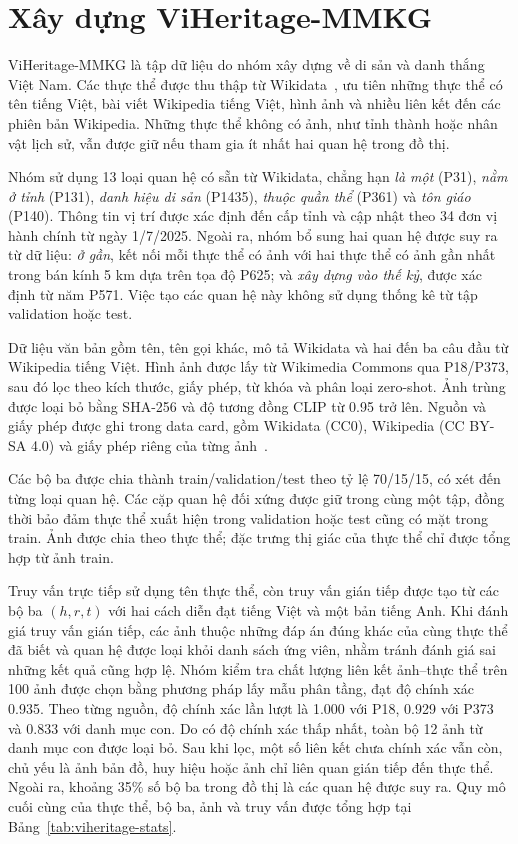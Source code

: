 \section{Xây dựng ViHeritage-MMKG}
\label{sec:viheritage-construction}

ViHeritage-MMKG là tập dữ liệu do nhóm xây dựng về di sản và danh thắng Việt Nam. Các thực thể được thu thập từ Wikidata~\cite{vrandecic2014wikidata}, ưu tiên những thực thể có tên tiếng Việt, bài viết Wikipedia tiếng Việt, hình ảnh và nhiều liên kết đến các phiên bản Wikipedia. Những thực thể không có ảnh, như tỉnh thành hoặc nhân vật lịch sử, vẫn được giữ nếu tham gia ít nhất hai quan hệ trong đồ thị.

Nhóm sử dụng 13 loại quan hệ có sẵn từ Wikidata, chẳng hạn \textit{là một} (P31), \textit{nằm ở tỉnh} (P131), \textit{danh hiệu di sản} (P1435), \textit{thuộc quần thể} (P361) và \textit{tôn giáo} (P140). Thông tin vị trí được xác định đến cấp tỉnh và cập nhật theo 34 đơn vị hành chính từ ngày 1/7/2025. Ngoài ra, nhóm bổ sung hai quan hệ được suy ra từ dữ liệu: \textit{ở gần}, kết nối mỗi thực thể có ảnh với hai thực thể có ảnh gần nhất trong bán kính 5 km dựa trên tọa độ P625; và \textit{xây dựng vào thế kỷ}, được xác định từ năm P571. Việc tạo các quan hệ này không sử dụng thống kê từ tập validation hoặc test.

Dữ liệu văn bản gồm tên, tên gọi khác, mô tả Wikidata và hai đến ba câu đầu từ Wikipedia tiếng Việt. Hình ảnh được lấy từ Wikimedia Commons qua P18/P373, sau đó lọc theo kích thước, giấy phép, từ khóa và phân loại zero-shot. Ảnh trùng được loại bỏ bằng SHA-256 và độ tương đồng CLIP từ 0.95 trở lên. Nguồn và giấy phép được ghi trong data card, gồm Wikidata (CC0), Wikipedia (CC BY-SA 4.0) và giấy phép riêng của từng ảnh~\cite{wikidataLicensing,wikipediaCopyrights,commonsLicensing}.

Các bộ ba được chia thành train/validation/test theo tỷ lệ 70/15/15, có xét đến từng loại quan hệ. Các cặp quan hệ đối xứng được giữ trong cùng một tập, đồng thời bảo đảm thực thể xuất hiện trong validation hoặc test cũng có mặt trong train. Ảnh được chia theo thực thể; đặc trưng thị giác của thực thể chỉ được tổng hợp từ ảnh train.

Truy vấn trực tiếp sử dụng tên thực thể, còn truy vấn gián tiếp được tạo từ các bộ ba $(h,r,t)$ với hai cách diễn đạt tiếng Việt và một bản tiếng Anh. Khi đánh giá truy vấn gián tiếp, các ảnh thuộc những đáp án đúng khác của cùng thực thể đã biết và quan hệ được loại khỏi danh sách ứng viên, nhằm tránh đánh giá sai những kết quả cũng hợp lệ. Nhóm kiểm tra chất lượng liên kết ảnh--thực thể trên 100 ảnh được chọn bằng phương pháp lấy mẫu phân tầng, đạt độ chính xác 0.935. Theo từng nguồn, độ chính xác lần lượt là 1.000 với P18, 0.929 với P373 và 0.833 với danh mục con. Do có độ chính xác thấp nhất, toàn bộ 12 ảnh từ danh mục con được loại bỏ. Sau khi lọc, một số liên kết chưa chính xác vẫn còn, chủ yếu là ảnh bản đồ, huy hiệu hoặc ảnh chỉ liên quan gián tiếp đến thực thể. Ngoài ra, khoảng 35\% số bộ ba trong đồ thị là các quan hệ được suy ra. Quy mô cuối cùng của thực thể, bộ ba, ảnh và truy vấn được tổng hợp tại Bảng~\ref{tab:viheritage-stats}.

